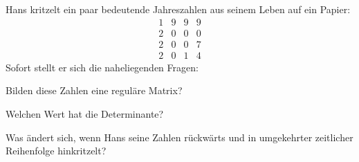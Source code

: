 Hans kritzelt ein paar bedeutende Jahreszahlen aus seinem Leben
auf ein Papier:
\[
\begin{matrix}
1&9&9&9\\
2&0&0&0\\
2&0&0&7\\
2&0&1&4
\end{matrix}
\]
Sofort stellt er sich die naheliegenden Fragen:
\begin{teilaufgaben}
\item Bilden diese Zahlen eine reguläre Matrix? 
\item Welchen Wert hat die Determinante?
\item Was ändert sich, wenn Hans seine Zahlen rückwärts und in
umgekehrter zeitlicher Reihenfolge hinkritzelt?
\end{teilaufgaben}


